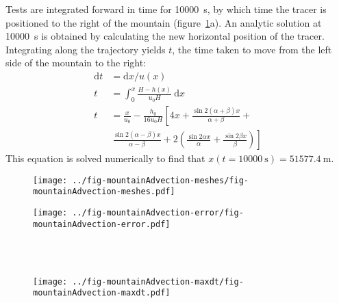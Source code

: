 Tests are integrated forward in time for \SI{10000}{\second}, by which time the tracer is positioned to the right of the mountain (figure~\ref{fig:mountainAdvection}a).
An analytic solution at \SI{10000}{\second} is obtained by calculating the new horizontal position of the tracer.  Integrating along the trajectory yields $t$, the time taken to move from the left side of the mountain to the right:
\begin{align}
	\mathrm{d}t &= \mathrm{d}x / u(x) \\
	t &= \int_0^x \frac{H - h(x)}{u_0 H}\:\mathrm{d}x \\
	t &= \frac{x}{u_0} - \frac{h_0}{16 u_0 H} \left[ 4x + \frac{\sin 2 (\alpha + \beta) x}{\alpha + \beta} \right.+ \nonumber \\
   &\ \left. \frac{\sin 2(\alpha - \beta) x}{\alpha - \beta} + 2 \left( \frac{\sin 2\alpha x}{\alpha} + \frac{\sin 2\beta x}{\beta} \right) \right]
\end{align}
This equation is solved numerically to find that \(x(t=\SI{10000}{\second}) = \SI{51577.4}{\meter}\).  

\begin{figure}
	\centering
	\texttt{[image: ../fig-mountainAdvection-meshes/fig-mountainAdvection-meshes.pdf]}
	\caption{}
\end{figure}

\begin{figure}
	\centering
	\texttt{[image: ../fig-mountainAdvection-error/fig-mountainAdvection-error.pdf]}
	\caption{ \\
	 \\
	}
	\label{fig:mountainAdvection}
\end{figure}

\begin{figure}
	\centering
	\texttt{[image: ../fig-mountainAdvection-maxdt/fig-mountainAdvection-maxdt.pdf]}
	\caption{}
\end{figure}

